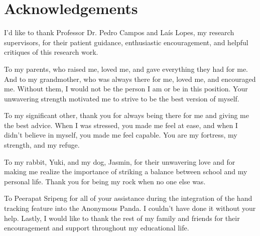 \chapter*{Acknowledgements}

I'd like to thank Professor Dr. Pedro Campos and Laís Lopes, my research supervisors, for their patient guidance, enthusiastic encouragement, and helpful critiques of this research work. 

To my parents, who raised me, loved me, and gave everything they had for me. And to my grandmother, who was always there for me, loved me, and encouraged me. Without them, I would not be the person I am or be in this position. Your unwavering strength motivated me to strive to be the best version of myself.

To my significant other, thank you for always being there for me and giving me the best advice. When I was stressed, you made me feel at ease, and when I didn't believe in myself, you made me feel capable. You are my fortress, my strength, and my refuge.

To my rabbit, Yuki, and my dog, Jasmin, for their unwavering love and for making me realize the importance of striking a balance between school and my personal life. Thank you for being my rock when no one else was.

To Peerapat Sripeng for all of your assistance during the integration of the hand tracking feature into the Anonymous Panda. I couldn't have done it without your help. Lastly, I would like to thank the rest of my family and friends for their encouragement and support throughout my educational life.